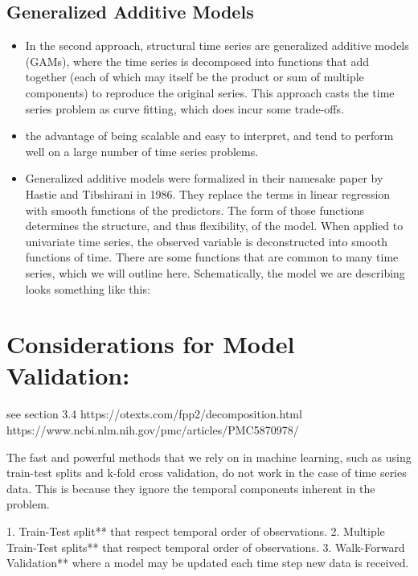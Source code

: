 \documentclass[openany]{book}
\begin{document}
\subsection{Generalized Additive Models}

\begin{itemize}

    \item In the second approach, structural time series are generalized additive models (GAMs), where the time series is decomposed into functions that add together (each of which may itself be the product or sum of multiple components) to reproduce the original series. This approach casts the time series problem as curve fitting, which does incur some trade-offs. 
    
    \item  the advantage of being scalable and easy to interpret, and tend to perform well on a large number of time series problems.

    \item Generalized additive models were formalized in their namesake paper by Hastie and Tibshirani in 1986. They replace the terms in linear regression with smooth functions of the predictors. The form of those functions determines the structure, and thus flexibility, of the model. When applied to univariate time series, the observed variable is deconstructed into smooth functions of time. There are some functions that are common to many time series, which we will outline here. Schematically, the model we are describing looks something like this:

\end{itemize}


\section{Considerations for Model Validation:}

see section 3.4 https://otexts.com/fpp2/decomposition.html
https://www.ncbi.nlm.nih.gov/pmc/articles/PMC5870978/




The fast and powerful methods that we rely on in machine learning, such as using train-test splits and k-fold cross validation, do not work in the case of time series data. This is because they ignore the temporal components inherent in the problem.

1. Train-Test split** that respect temporal order of observations.
2. Multiple Train-Test splits** that respect temporal order of observations.
3. Walk-Forward Validation** where a model may be updated each time step new data is received.
\end{document}
